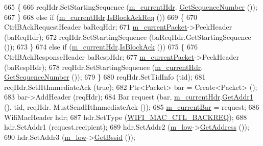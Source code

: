 \begin{DoxyCode}
665             \{
666               reqHdr.SetStartingSequence (\hyperlink{classns3_1_1DcaTxop_ae965eb2f4d504e00526e751cd1dab3a6}{m\_currentHdr}.
      \hyperlink{classns3_1_1WifiMacHeader_aa202a29c2d6aebe9b3d589e58cbd17bb}{GetSequenceNumber} ());
667             \}
668           \textcolor{keywordflow}{else} \textcolor{keywordflow}{if} (\hyperlink{classns3_1_1DcaTxop_ae965eb2f4d504e00526e751cd1dab3a6}{m\_currentHdr}.\hyperlink{classns3_1_1WifiMacHeader_a44f012384009b131d21512459c727f02}{IsBlockAckReq} ())
669             \{
670               CtrlBAckRequestHeader baReqHdr;
671               \hyperlink{classns3_1_1DcaTxop_a3c454c21337aac0944f86caad8b7a719}{m\_currentPacket}->PeekHeader (baReqHdr);
672               reqHdr.SetStartingSequence (baReqHdr.GetStartingSequence ());
673             \}
674           \textcolor{keywordflow}{else} \textcolor{keywordflow}{if} (\hyperlink{classns3_1_1DcaTxop_ae965eb2f4d504e00526e751cd1dab3a6}{m\_currentHdr}.\hyperlink{classns3_1_1WifiMacHeader_a273fb5273dcb6c690ac66a7caf72d305}{IsBlockAck} ())
675             \{
676               CtrlBAckResponseHeader baRespHdr;
677               \hyperlink{classns3_1_1DcaTxop_a3c454c21337aac0944f86caad8b7a719}{m\_currentPacket}->PeekHeader (baRespHdr);
678               reqHdr.SetStartingSequence (\hyperlink{classns3_1_1DcaTxop_ae965eb2f4d504e00526e751cd1dab3a6}{m\_currentHdr}.
      \hyperlink{classns3_1_1WifiMacHeader_aa202a29c2d6aebe9b3d589e58cbd17bb}{GetSequenceNumber} ());
679             \}
680           reqHdr.SetTidInfo (tid);
681           reqHdr.SetHtImmediateAck (\textcolor{keyword}{true});
682           Ptr<Packet> bar = Create<Packet> ();
683           bar->AddHeader (reqHdr);
684           Bar request (bar, \hyperlink{classns3_1_1DcaTxop_ae965eb2f4d504e00526e751cd1dab3a6}{m\_currentHdr}.\hyperlink{classns3_1_1WifiMacHeader_a5ddcfd82e7c5a17ffea5be9246544530}{GetAddr1} (), tid, reqHdr.
      MustSendHtImmediateAck ());
685           \hyperlink{classns3_1_1EdcaTxopN_a8500ea69876682da40eab4222b7066c5}{m\_currentBar} = request;
686           WifiMacHeader hdr;
687           hdr.SetType (\hyperlink{namespacens3_a9318472db39b35b2092de5c721e6ab0aa1b3c29e4b46847a71ad8f3b45c747456}{WIFI\_MAC\_CTL\_BACKREQ});
688           hdr.SetAddr1 (request.recipient);
689           hdr.SetAddr2 (\hyperlink{classns3_1_1DcaTxop_a76de11e512290acc37c9863f7ab17758}{m\_low}->\hyperlink{classns3_1_1MacLow_a109922d4f2bb1ee0b2a66aa3bcc48e2f}{GetAddress} ());
690           hdr.SetAddr3 (\hyperlink{classns3_1_1DcaTxop_a76de11e512290acc37c9863f7ab17758}{m\_low}->\hyperlink{classns3_1_1MacLow_a4d11b37c976a0bac9d123fcc4b1fb9e6}{GetBssid} ());

\end{DoxyCode}
